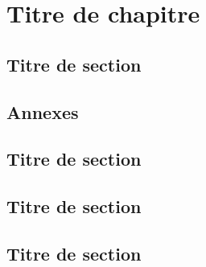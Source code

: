 \documentclass{scrbook}
\begin{document}
\tableofcontents
\setcounter{tocdepth}{1}%

\chapter{Titre de chapitre}

\minitoc

\section{Titre de section}

\backmatter
{}
\begin{appendix}
	\chapter{Annexes}

	\minitoc

	\section{Titre de section}
	\section{Titre de section}
	\section{Titre de section}
\end{appendix}
\end{document}
